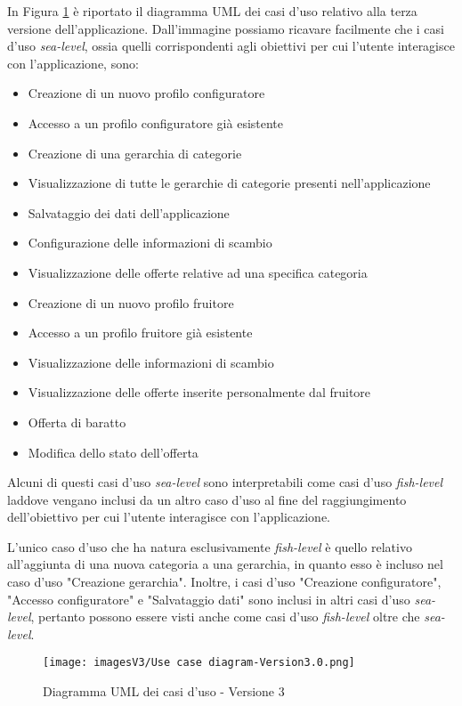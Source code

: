 In Figura \ref{fig:Use Case 3} è riportato il diagramma UML dei casi d'uso relativo alla terza versione dell'applicazione. Dall'immagine possiamo ricavare facilmente che i casi d'uso \textit{sea-level}, ossia quelli corrispondenti agli obiettivi per cui l'utente interagisce con l'applicazione, sono:
\begin{itemize}
    \item Creazione di un nuovo profilo configuratore 
    \item Accesso a un profilo configuratore già esistente
    \item Creazione di una gerarchia di categorie
    \item Visualizzazione di tutte le gerarchie di categorie presenti nell'applicazione
    \item Salvataggio dei dati dell'applicazione
    \item Configurazione delle informazioni di scambio
    \item Visualizzazione delle offerte relative ad una specifica categoria
    \item Creazione di un nuovo profilo fruitore
    \item Accesso a un profilo fruitore già esistente
    \item Visualizzazione delle informazioni di scambio
    \item Visualizzazione delle offerte inserite personalmente dal fruitore
    \item Offerta di baratto
    \item Modifica dello stato dell'offerta  
\end{itemize}
Alcuni di questi casi d'uso \textit{sea-level} sono interpretabili come casi d'uso \textit{fish-level} laddove vengano inclusi da un altro caso d'uso al fine del raggiungimento dell'obiettivo per cui l'utente interagisce con l'applicazione.

L'unico caso d'uso che ha natura esclusivamente \textit{fish-level} è quello relativo all'aggiunta di una nuova categoria a una gerarchia, in quanto esso è incluso nel caso d'uso "Creazione gerarchia". Inoltre, i casi d'uso "Creazione configuratore", "Accesso configuratore" e "Salvataggio dati" sono inclusi in altri casi d'uso \textit{sea-level}, pertanto possono essere visti anche come casi d'uso \textit{fish-level} oltre che \textit{sea-level}.

\begin{figure}[ht]
\centering
\texttt{[image: imagesV3/Use case diagram-Version3.0.png]}
\caption{\label{fig:Use Case 3}Diagramma UML dei casi d'uso - Versione 3}
\end{figure}\bigskip

